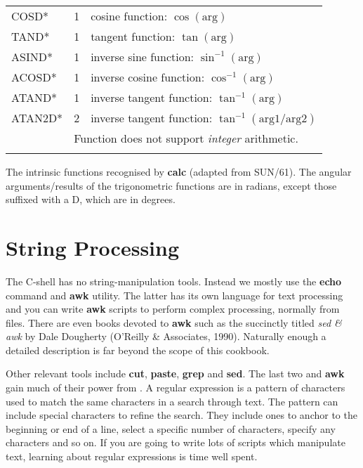 \begin{center}
\begin{tabular}{lcl}
COSD* & 1 & cosine function: $\cos (\mbox{arg})$ \\
TAND* & 1 & tangent function: $\tan (\mbox{arg})$ \\
ASIND* & 1 & inverse sine function: $\sin ^{-1}(\mbox{arg})$ \\
ACOSD* & 1 & inverse cosine function: $\cos ^{-1}(\mbox{arg})$ \\
ATAND* & 1 & inverse tangent function: $\tan ^{-1}(\mbox{arg})$ \\
ATAN2D* & 2 & inverse tangent function: $\tan ^{-1}(\mbox{arg1/arg2})$ \\
\multicolumn{1}{r}{} &
\multicolumn{2}{l}{\footnotesize *Function does not support {\em integer}
arithmetic.}\\
\\ \hline
\end{tabular}
\end{center}
The intrinsic functions recognised by {\bf calc} (adapted from SUN/61).
The angular arguments/results of the trigonometric functions are in
radians, except those suffixed with a D, which are in degrees.
\label{sc4_table:intrinsics}

\newpage
\section{String Processing
\label{sc4_se_string_proc}}

The C-shell has no string-manipulation tools.  Instead we mostly use
the {\bf echo} command and {\bf awk} utility.  The latter has its own
language for text processing and you can write {\bf awk} scripts to
perform complex processing, normally from files.  There are even books
devoted to {\bf awk} such as the succinctly titled {\sl sed \& awk} by
Dale Dougherty (O'Reilly \& Associates, 1990).  Naturally enough a
detailed description is far beyond the scope of this cookbook.

Other relevant tools include {\bf cut}, {\bf paste}, {\bf grep} and
{\bf sed}.  The last two and {\bf awk} gain much of their power from
.  A regular expression
is a pattern of characters used to match the same characters in a
search through text.  The pattern can include special characters to
refine the search.  They include ones to anchor to the beginning or
end of a line, select a specific number of characters, specify any
characters and so on.  If you are going to write lots of scripts which
manipulate text, learning about regular expressions is time well
spent.

